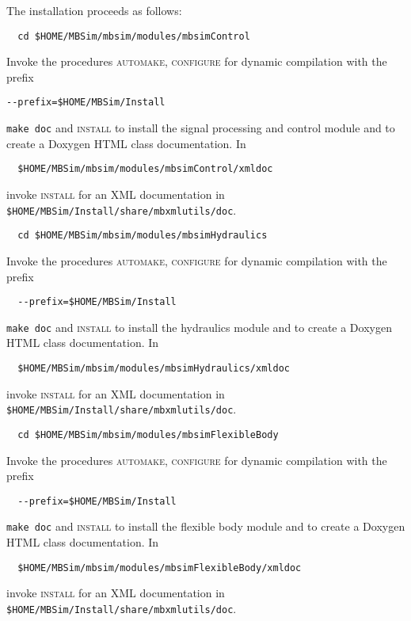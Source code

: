 The installation proceeds as follows:
\begin{verbatim}
  cd $HOME/MBSim/mbsim/modules/mbsimControl
\end{verbatim}
Invoke the procedures \textsc{automake, configure} for dynamic compilation with the prefix
\begin{verbatim}
--prefix=$HOME/MBSim/Install
\end{verbatim}
\texttt{make doc} and \textsc{install} to install the signal processing and control module and to create a Doxygen HTML class documentation. In 
\begin{verbatim}
  $HOME/MBSim/mbsim/modules/mbsimControl/xmldoc
\end{verbatim}
invoke \textsc{install} for an XML documentation in \texttt{\$HOME/MBSim/Install/share/mbxmlutils/doc}.\vspace{5mm}
\begin{verbatim}
  cd $HOME/MBSim/mbsim/modules/mbsimHydraulics
\end{verbatim}
Invoke the procedures \textsc{automake, configure} for dynamic compilation with the prefix
\begin{verbatim}
  --prefix=$HOME/MBSim/Install
\end{verbatim}
\texttt{make doc} and \textsc{install} to install the hydraulics module and to create a Doxygen HTML class documentation. In 
\begin{verbatim}
  $HOME/MBSim/mbsim/modules/mbsimHydraulics/xmldoc
\end{verbatim}
invoke \textsc{install} for an XML documentation in \texttt{\$HOME/MBSim/Install/share/mbxmlutils/doc}.\vspace{5mm}
\begin{verbatim}
  cd $HOME/MBSim/mbsim/modules/mbsimFlexibleBody
\end{verbatim}
Invoke the procedures \textsc{automake, configure} for dynamic compilation with the prefix
\begin{verbatim}
  --prefix=$HOME/MBSim/Install
\end{verbatim}
\texttt{make doc} and \textsc{install} to install the flexible body module and to create a Doxygen HTML class documentation. In 
\begin{verbatim}
  $HOME/MBSim/mbsim/modules/mbsimFlexibleBody/xmldoc
\end{verbatim}
invoke \textsc{install} for an XML documentation in \texttt{\$HOME/MBSim/Install/share/mbxmlutils/doc}.\vspace{5mm}
